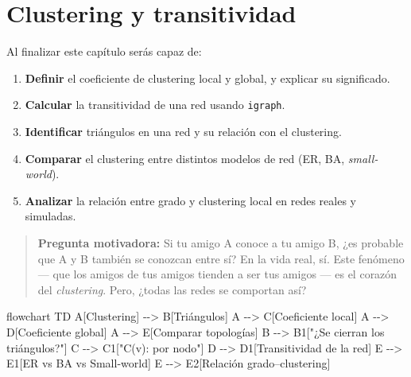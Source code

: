 \documentclass[
  letterpaper,
  DIV=11,
  numbers=noendperiod]{scrreprt}
\newenvironment{Shaded}{\begin{snugshade}}{\end{snugshade}}
\newcommand{\NormalTok}[1]{\textcolor[rgb]{0.00,0.23,0.31}{#1}}
\providecommand{\tightlist}{%
  \setlength{\itemsep}{0pt}\setlength{\parskip}{0pt}}
\begin{document}

\chapter{Clustering y transitividad}\label{sec-clustering}

\begin{tcolorbox}[enhanced jigsaw, toprule=.15mm, colframe=quarto-callout-note-color-frame, coltitle=black, titlerule=0mm, colback=white, breakable, leftrule=.75mm, arc=.35mm, bottomtitle=1mm, toptitle=1mm, rightrule=.15mm, bottomrule=.15mm, left=2mm, title=\textcolor{quarto-callout-note-color}{\faInfo}\hspace{0.5em}{🎯 Objetivos de aprendizaje}, colbacktitle=quarto-callout-note-color!10!white, opacityback=0, opacitybacktitle=0.6]

Al finalizar este capítulo serás capaz de:

\begin{enumerate}
\def\labelenumi{\arabic{enumi}.}
\tightlist
\item
  \textbf{Definir} el coeficiente de clustering local y global, y
  explicar su significado.
\item
  \textbf{Calcular} la transitividad de una red usando \texttt{igraph}.
\item
  \textbf{Identificar} triángulos en una red y su relación con el
  clustering.
\item
  \textbf{Comparar} el clustering entre distintos modelos de red (ER,
  BA, \emph{small-world}).
\item
  \textbf{Analizar} la relación entre grado y clustering local en redes
  reales y simuladas.
\end{enumerate}

\end{tcolorbox}

\begin{quote}
\textbf{Pregunta motivadora:} Si tu amigo A conoce a tu amigo B, ¿es
probable que A y B también se conozcan entre sí? En la vida real, sí.
Este fenómeno --- que los amigos de tus amigos tienden a ser tus amigos
--- es el corazón del \emph{clustering}. Pero, ¿todas las redes se
comportan así?
\end{quote}

\begin{Shaded}
\begin{Highlighting}[]
\NormalTok{flowchart TD}
\NormalTok{    A[Clustering] {-}{-}\textgreater{} B[Triángulos]}
\NormalTok{    A {-}{-}\textgreater{} C[Coeficiente local]}
\NormalTok{    A {-}{-}\textgreater{} D[Coeficiente global]}
\NormalTok{    A {-}{-}\textgreater{} E[Comparar topologías]}
\NormalTok{    B {-}{-}\textgreater{} B1["¿Se cierran los triángulos?"]}
\NormalTok{    C {-}{-}\textgreater{} C1["C(v): por nodo"]}
\NormalTok{    D {-}{-}\textgreater{} D1[Transitividad de la red]}
\NormalTok{    E {-}{-}\textgreater{} E1[ER vs BA vs Small{-}world]}
\NormalTok{    E {-}{-}\textgreater{} E2[Relación grado–clustering]}
\end{Highlighting}
\end{Shaded}
\end{document}
